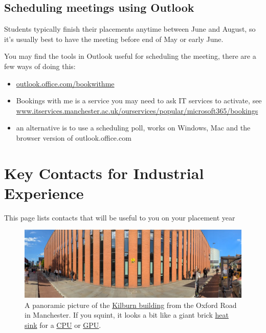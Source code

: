 \documentclass[
]{book}
\providecommand{\tightlist}{%
  \setlength{\itemsep}{0pt}\setlength{\parskip}{0pt}}
\begin{document}
\section{Scheduling meetings using Outlook}\label{schedule}

Students typically finish their placements anytime between June and August, so it's usually best to have the meeting before end of May or early June.

You may find the tools in Outlook useful for scheduling the meeting, there are a few ways of doing this:

\begin{itemize}
\tightlist
\item
  \href{https://outlook.office.com/bookwithme}{outlook.office.com/bookwithme}
\item
  Bookings with me is a service you may need to ask IT services to activate, see \href{https://www.itservices.manchester.ac.uk/ourservices/popular/microsoft365/bookings/}{www.itservices.manchester.ac.uk/ourservices/popular/microsoft365/bookings}
\item
  an alternative is to use a scheduling poll, works on Windows, Mac and the browser version of outlook.office.com \citep{poll}
\end{itemize}

\chapter{Key Contacts for Industrial Experience}\label{contacts}

This page lists contacts that will be useful to you on your placement year

\begin{figure}

{\centering \includegraphics[width=1\linewidth]{images/kilburnarama} 

}

\caption{A panoramic picture of the \href{https://en.wikipedia.org/wiki/Kilburn_Building}{Kilburn building} from the Oxford Road in Manchester. If you squint, it looks a bit like a giant brick \href{https://en.wikipedia.org/wiki/Heat_sink}{heat sink} for a \href{https://en.wikipedia.org/wiki/Central_processing_unit}{CPU} or \href{https://en.wikipedia.org/wiki/Graphics_processing_unit}{GPU}.}\label{fig:kilburn-fig}
\end{figure}
\end{document}
